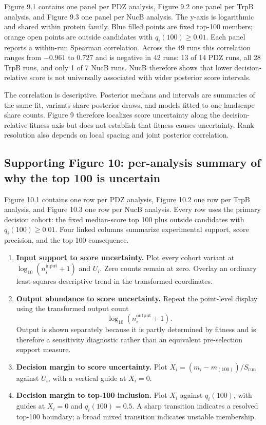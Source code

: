 \documentclass[11pt]{article}
\begin{document}
Figure 9.1 contains one panel per PDZ analysis, Figure 9.2 one panel per TrpB analysis, and Figure 9.3 one panel per NucB analysis. The y-axis is logarithmic and shared within protein family. Blue filled points are fixed top-100 members; orange open points are outside candidates with $q_i(100)\geq0.01$. Each panel reports a within-run Spearman correlation. Across the 49 runs this correlation ranges from $-0.961$ to $0.727$ and is negative in 42 runs: 13 of 14 PDZ runs, all 28 TrpB runs, and only 1 of 7 NucB runs. NucB therefore shows that lower decision-relative score is not universally associated with wider posterior score intervals.

The correlation is descriptive. Posterior medians and intervals are summaries of the same fit, variants share posterior draws, and models fitted to one landscape share counts. Figure 9 therefore localizes score uncertainty along the decision-relative fitness axis but does not establish that fitness causes uncertainty. Rank resolution also depends on local spacing and joint posterior correlation.

\subsection*{Supporting Figure 10: per-analysis summary of why the top 100 is uncertain}

Figure 10.1 contains one row per PDZ analysis, Figure 10.2 one row per TrpB analysis, and Figure 10.3 one row per NucB analysis. Every row uses the primary decision cohort: the fixed median-score top 100 plus outside candidates with $q_i(100)\geq0.01$. Four linked columns summarize experimental support, score precision, and the top-100 consequence.

\begin{enumerate}
  \item \textbf{Input support to score uncertainty.} Plot every cohort variant at $\log_{10}(n_i^{\mathrm{input}}+1)$ and $U_i$. Zero counts remain at zero. Overlay an ordinary least-squares descriptive trend in the transformed coordinates.
  \item \textbf{Output abundance to score uncertainty.} Repeat the point-level display using the transformed output count
  \[
  \log_{10}(n_i^{\mathrm{output}}+1).
  \]
  Output is shown separately because it is partly determined by fitness and is therefore a sensitivity diagnostic rather than an equivalent pre-selection support measure.
  \item \textbf{Decision margin to score uncertainty.} Plot $X_i=(m_i-m_{(100)})/S_{\mathrm{run}}$ against $U_i$, with a vertical guide at $X_i=0$.
  \item \textbf{Decision margin to top-100 inclusion.} Plot $X_i$ against $q_i(100)$, with guides at $X_i=0$ and $q_i(100)=0.5$. A sharp transition indicates a resolved top-100 boundary; a broad mixed transition indicates unstable membership.
\end{enumerate}
\end{document}
